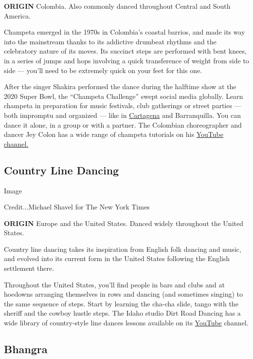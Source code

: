 \textbf{ORIGIN} Colombia. Also commonly danced throughout Central and
South America.

Champeta emerged in the 1970s in Colombia's coastal barrios, and made
its way into the mainstream thanks to its addictive drumbeat rhythms and
the celebratory nature of its moves. Its succinct steps are performed
with bent knees, in a series of jumps and hops involving a quick
transference of weight from side to side --- you'll need to be extremely
quick on your feet for this one.

After the singer Shakira performed the dance during the halftime show at
the 2020 Super Bowl, the ``Champeta Challenge'' swept social media
globally. Learn champeta in preparation for music festivals, club
gatherings or street parties --- both impromptu and organized --- like
in
\href{https://theculturetrip.com/south-america/colombia/articles/how-to-spend-3-days-in-cartagena/}{Cartagena}
and Barranquilla. You can dance it alone, in a group or with a partner.
The Colombian choreographer and dancer Jey Colon has a wide range of
champeta tutorials on his
\href{https://www.youtube.com/c/JeyColon/featured}{YouTube channel.}

\hypertarget{country-line-dancing}{%
\subsection{Country Line Dancing}\label{country-line-dancing}}

Image

Credit...Michael Shavel for The New York Times

\textbf{ORIGIN} Europe and the United States. Danced widely throughout
the United States.

Country line dancing takes its inspiration from English folk dancing and
music, and evolved into its current form in the United States following
the English settlement there.

Throughout the United States, you'll find people in bars and clubs and
at hoedowns arranging themselves in rows and dancing (and sometimes
singing) to the same sequence of steps. Start by learning the cha-cha
slide, tango with the sheriff and the cowboy hustle steps. The Idaho
studio Dirt Road Dancing has a wide library of country-style line dances
lessons available on its
\href{https://www.youtube.com/c/DirtRoadDancing/featured}{YouTube}
channel.

\hypertarget{bhangra}{%
\subsection{Bhangra}\label{bhangra}}

